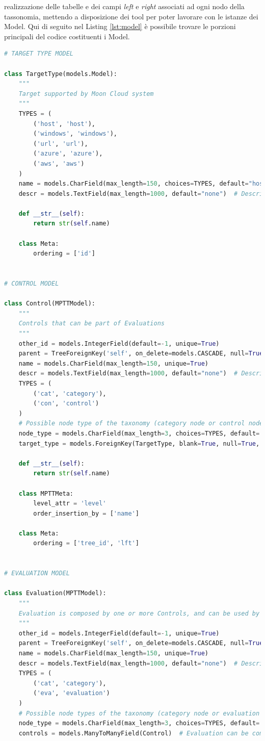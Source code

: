 realizzazione delle tabelle e dei campi \textit{left} e \textit{right} associati ad ogni nodo della tassonomia, mettendo a disposizione dei 
tool per poter lavorare con le istanze dei Model. Qui di seguito nel Listing \ref{lst:model} è possibile trovare le porzioni principali del 
codice costituenti i Model.
%
\lstset{style=python_code_style}
\begin{lstlisting}[language=Python, label=lst:model, caption={Parti principali del codice che costituiscono i Model della soluzione.}]
# TARGET TYPE MODEL
 
class TargetType(models.Model):
    """
    Target supported by Moon Cloud system
    """
    TYPES = (
        ('host', 'host'),
        ('windows', 'windows'),
        ('url', 'url'),
        ('azure', 'azure'),
        ('aws', 'aws')
    )
    name = models.CharField(max_length=150, choices=TYPES, default="host")
    descr = models.TextField(max_length=1000, default="none")  # Description of a target
 
    def __str__(self):
        return str(self.name)
 
    class Meta:
        ordering = ['id']
 
 
# CONTROL MODEL
 
class Control(MPTTModel):
    """
    Controls that can be part of Evaluations
    """
    other_id = models.IntegerField(default=-1, unique=True)
    parent = TreeForeignKey('self', on_delete=models.CASCADE, null=True, blank=True, related_name='children')
    name = models.CharField(max_length=150, unique=True)
    descr = models.TextField(max_length=1000, default="none")  # Description of a node in the taxonomy
    TYPES = (
        ('cat', 'category'),
        ('con', 'control')
    )
    # Possible node type of the taxonomy (category node or control node)
    node_type = models.CharField(max_length=3, choices=TYPES, default='cat')
    target_type = models.ForeignKey(TargetType, blank=True, null=True, on_delete=models.CASCADE)  # It's null for the root node and category nodes
 
    def __str__(self):
        return str(self.name)
 
    class MPTTMeta:
        level_attr = 'level'
        order_insertion_by = ['name']
 
    class Meta:
        ordering = ['tree_id', 'lft']
 
 
# EVALUATION MODEL
 
class Evaluation(MPTTModel):
    """
    Evaluation is composed by one or more Controls, and can be used by Users
    """
    other_id = models.IntegerField(default=-1, unique=True)
    parent = TreeForeignKey('self', on_delete=models.CASCADE, null=True, blank=True, related_name='children')
    name = models.CharField(max_length=150, unique=True)
    descr = models.TextField(max_length=1000, default="none")  # Description of a node in the taxonomy
    TYPES = (
        ('cat', 'category'),
        ('eva', 'evaluation')
    )
    # Possible node types of the taxonomy (category node or evaluation node)
    node_type = models.CharField(max_length=3, choices=TYPES, default='cat')
    controls = models.ManyToManyField(Control)  # Evaluation can be composed of one or more controls
 

\end{lstlisting}
